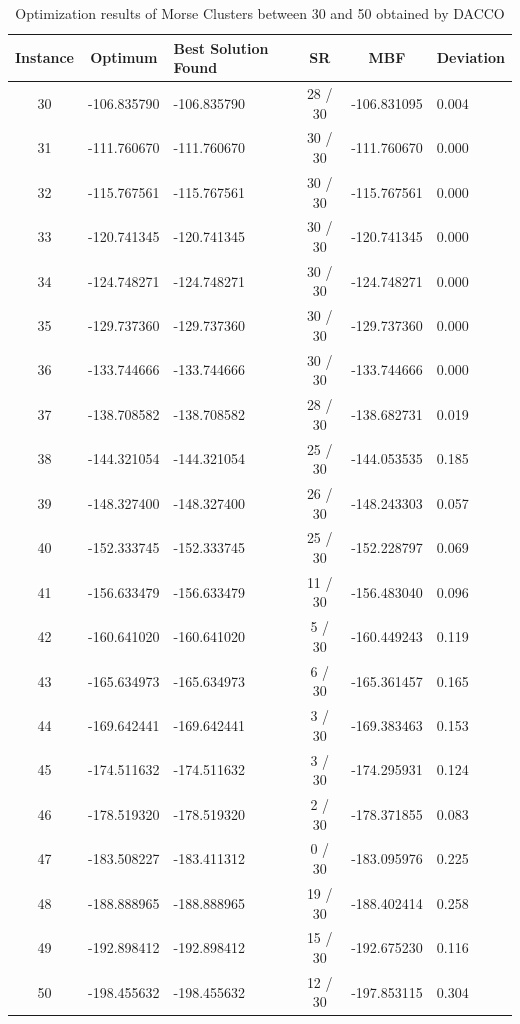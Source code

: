 	\begin{table}[!htbp]
		\begin{center}
			\begin{tabular}{| c | c | p{3cm} | c | c | p{2cm} |}
				\hline
				\textbf{Instance} & \textbf{Optimum} & \textbf{Best Solution Found} & \textbf{SR} & \textbf{MBF} & \textbf{Deviation}\\ \hline
				30 & -106.835790 & -106.835790 & 28 / 30 & -106.831095 & 0.004 \\ \hline
				31 & -111.760670 & -111.760670 & 30 / 30 & -111.760670 & 0.000 \\ \hline
				32 & -115.767561 & -115.767561 & 30 / 30 & -115.767561 & 0.000 \\ \hline
				33 & -120.741345 & -120.741345 & 30 / 30 & -120.741345 & 0.000 \\ \hline
				34 & -124.748271 & -124.748271 & 30 / 30 & -124.748271 & 0.000 \\ \hline
				35 & -129.737360 & -129.737360 & 30 / 30 & -129.737360 & 0.000 \\ \hline
				36 & -133.744666 & -133.744666 & 30 / 30 & -133.744666 & 0.000 \\ \hline
				37 & -138.708582 & -138.708582 & 28 / 30 & -138.682731 & 0.019 \\ \hline
				38 & -144.321054 & -144.321054 & 25 / 30 & -144.053535 & 0.185 \\ \hline
				39 & -148.327400 & -148.327400 & 26 / 30 & -148.243303 & 0.057 \\ \hline
				40 & -152.333745 & -152.333745 & 25 / 30 & -152.228797 & 0.069 \\ \hline
				41 & -156.633479 & -156.633479 & 11 / 30 & -156.483040 & 0.096 \\ \hline
				42 & -160.641020 & -160.641020 & 5 / 30 & -160.449243 & 0.119 \\ \hline
				43 & -165.634973 & -165.634973 & 6 / 30 & -165.361457 & 0.165 \\ \hline
				44 & -169.642441 & -169.642441 & 3 / 30 & -169.383463 & 0.153 \\ \hline
				45 & -174.511632 & -174.511632 & 3 / 30 & -174.295931 & 0.124 \\ \hline
				46 & -178.519320 & -178.519320 & 2 / 30 & -178.371855 & 0.083 \\ \hline
				47 & -183.508227 & -183.411312 & 0 / 30 & -183.095976 & 0.225 \\ \hline
				48 & -188.888965 & -188.888965 & 19 / 30 & -188.402414 & 0.258 \\ \hline
				49 & -192.898412 & -192.898412 & 15 / 30 & -192.675230 & 0.116 \\ \hline
				50 & -198.455632 & -198.455632 & 12 / 30 & -197.853115 & 0.304 \\ \hline
			\end{tabular}
		\caption{Optimization results of Morse Clusters between 30 and 50 obtained by DACCO}
		\label{tab:optimization_results}
		\end{center}
	\end{table}
	
